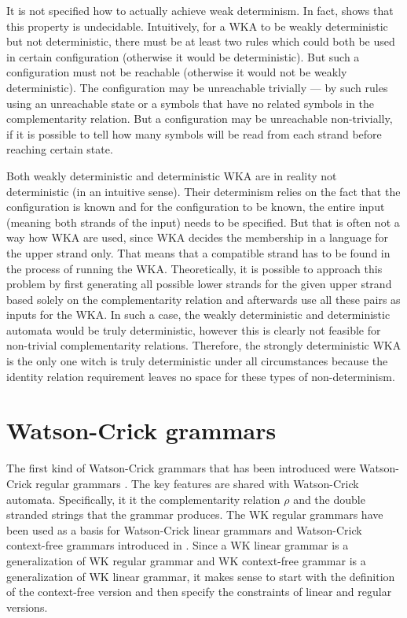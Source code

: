 It is not specified how to actually achieve weak determinism. In fact, \cite{DETERM_WKA} shows that this property is undecidable. Intuitively, for a WKA to be weakly deterministic but not deterministic, there must be at least two rules which could both be used in certain configuration (otherwise it would be deterministic). But such a configuration must not be reachable (otherwise it would not be weakly deterministic). The configuration may be unreachable trivially --- by such rules using an unreachable state or a symbols that have no related symbols in the complementarity relation. But a configuration may be unreachable non-trivially, if it is possible to tell how many symbols will be read from each strand before reaching certain state.

Both weakly deterministic and deterministic WKA are in reality not deterministic (in an intuitive sense). Their determinism relies on the fact that the configuration is known and for the configuration to be known, the entire input (meaning both strands of the input) needs to be specified. But that is often not a way how WKA are used, since WKA decides the membership in a language for the upper strand only. That means that a compatible strand has to be found in the process of running the WKA. Theoretically, it is possible to approach this problem by first generating all possible lower strands for the given upper strand based solely on the complementarity relation and afterwards use all these pairs as inputs for the WKA. In such a case, the weakly deterministic and deterministic automata would be truly deterministic, however this is clearly not feasible for non-trivial complementarity relations. Therefore, the strongly deterministic WKA is the only one witch is truly deterministic under all circumstances because the identity relation requirement leaves no space for these types of non-determinism.

\section{Watson-Crick grammars}
The first kind of Watson-Crick grammars that has been introduced were Watson-Crick regular grammars \cite{REG_GRAMMAR}. The key features are shared with Watson-Crick automata. Specifically, it it the complementarity relation $\rho$ and the double stranded strings that the grammar produces.
The WK regular grammars have been used as a basis for Watson-Crick linear grammars and Watson-Crick context-free grammars introduced in \cite{WK_GRAMMARS_1}. Since a WK linear grammar is a generalization of WK regular grammar and WK context-free grammar is a generalization of WK linear grammar, it makes sense to start with the definition of the context-free version and then specify the constraints of linear and regular versions.

